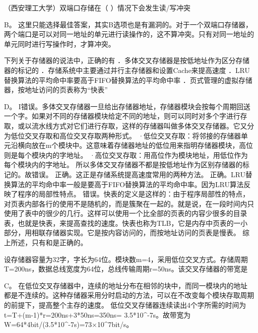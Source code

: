 \question （西安理工大学）双端口存储在（ ）情况下会发生读/写冲突
\par{}
\begin{solution}B。
这里只能选择最佳答案，其实B选项也是有漏洞的。对于一个双端口存储器，两个端口是可以对同一地址的单元进行读操作的，这不算冲突。只有对同一地址的单元同时进行写操作时，才算冲突。
\end{solution}
\question 下列关于存储器的说法中，正确的有
．多体交叉存储器是按低地址作为区分存储器的标记的
．存储系统中主要通过并行主存储器和设置Cache来提高速度
．LRU替换算法的平均命中率要高于FIFO替换算法的平均命中率
．页式管理的虚拟存储器，按地址访问的页表称为``快表''
\par{}
\begin{solution}D。
I错误。多体交叉存储器一旦给出存储器地址，存储器模块会按每个周期回送一个字。如果对不同的存储器模块给定不同的地址，则可以同时对多个字进行存取，或以流水线方式对它们进行存取，这样的存储器叫做多体交叉存储器。它又分为低位交叉存取和高位交叉存取两种形式。
·低位交叉存取：将邻接的存储器单元沿横向放在m个模块中。这意味着存储器地址的低位用来指明存储器模块，高位则是每个模块内的字地址。
·高位交叉存取：用高位作为模块地址，用低位作为每个模块内的字地址。
所以多体交叉存储器不都是按低地址作为区别存储器的标记的。故错误。
正确。这正是存储系统提高速度常用的两种方法。
正确。LRU替换算法的平均命中率一般是要高于FIFO替换算法的平均命中率。因为LRU算法反映了程序的局部性特点。
错误。快表的定义是这样的：由于程序局部性的特点，对页表内部各行的使用不是随机的，而是簇聚在一起的。就是说，在一段时间内只使用了表中的很少的几行。这样可以使用一个比全部的页表的内容少很多的目录表，也就是快表，来提高查找的速度。快表也称为TLB，它是内存中页表的一小部分，用相联存储器实现。它是按内容访问的，而按地址访问的页表是慢表。
综上所述，只有和是正确的。
\end{solution}
\question 设存储器容量为32字，字长为64位。模块数m=4，采用低位交叉方式。存储周期T=200ns，数据总线宽度为64位，总线传输周期r=50ns。该交叉存储器的带宽是
\par{}
\begin{solution}C。
在低位交叉存储器中，连续的地址分布在相邻的块中，而同一模块内的地址都是不连续的。这种存储器采用分时启动的方法，可以在不改变每个模块存取周期的前提下，提高整个主存的速度。
低位交叉存储器连续读出4个字所需的时间为t=T+(m-1)*r=200ns+3*50ns=350ns=
3.5*10\^{}-7s。故带宽为W=64*4bit/(3.5*10\^{}-7s)=73×10\^{}7bit/s。
\end{solution}
